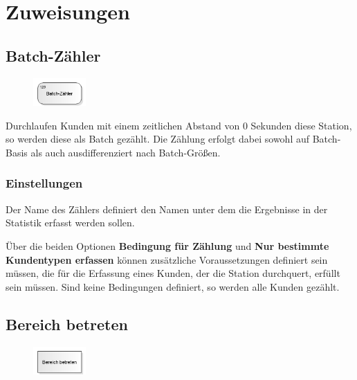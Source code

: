 \chapter{Zuweisungen}

\section{Batch-Zähler}
\label{ref:ModelElementCounterBatch}

\begin{figure}
\vspace{-22pt}
\includegraphics[width=2cm]{imageModelElementCounterBatch.png}
\vspace{-22pt}
\end{figure}

Durchlaufen Kunden mit einem zeitlichen Abstand von 0 Sekunden diese Station, so werden diese
als Batch gezählt. Die Zählung erfolgt dabei sowohl auf Batch-Basis als auch ausdifferenziert
nach Batch-Größen.

\subsection*{Einstellungen}

Der Name des Zählers definiert den Namen unter dem die Ergebnisse in der Statistik erfasst werden sollen.

Über die beiden Optionen \textbf{Bedingung für Zählung} und \textbf{Nur bestimmte Kundentypen erfassen} können zusätzliche
Voraussetzungen definiert sein müssen, die für die Erfassung eines Kunden, der die Station durchquert, erfüllt sein müssen.
Sind keine Bedingungen definiert, so werden alle Kunden gezählt.


\section{Bereich betreten}
\label{ref:ModelElementSectionStart}

\begin{figure}
\vspace{-22pt}
\includegraphics[width=2cm]{imageModelElementSectionStart.png}
\vspace{-22pt}
\end{figure}

